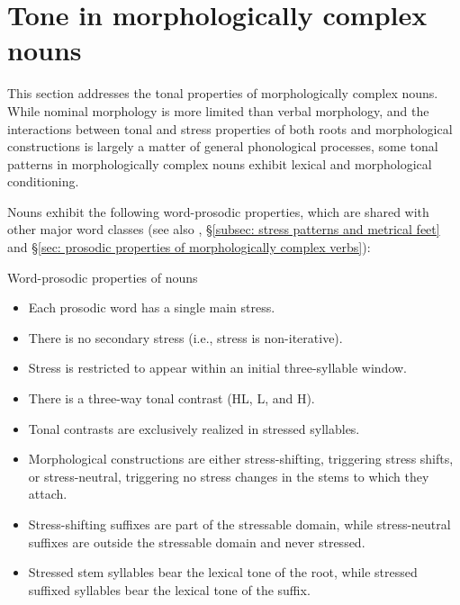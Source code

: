 


\section{Tone in morphologically complex nouns}
\label{sec: tone in morphologically complex nouns}
\largerpage[2]
This section addresses the tonal properties of morphologically complex nouns. While nominal morphology is more limited than verbal morphology, and the interactions between tonal and stress properties of both roots and morphological constructions is largely a matter of general phonological processes, some tonal patterns in morphologically complex nouns exhibit lexical and morphological conditioning.

Nouns exhibit the following word-prosodic properties, which are shared with other major word classes (see also , §\ref{subsec: stress patterns and metrical feet} and §\ref{sec: prosodic properties of morphologically complex verbs}):

\ea\label{ex: word-prosodic properties of nouns}
{Word-prosodic properties of nouns}\\

\begin{itemize}
    \item   Each prosodic word has a single main stress.\\
    \item   There is no secondary stress (i.e., stress is non-iterative).\\
    \item   Stress is restricted to appear within an initial three-syllable window.\\
    \item   There is a three-way tonal contrast (HL, L, and H).\\
    \item   Tonal contrasts are exclusively realized in stressed syllables.\\
    \item   Morphological constructions are either stress-shifting, triggering stress shifts, or stress-neutral, triggering no stress changes in the stems to which they attach.\\
    \item    Stress-shifting suffixes are part of the stressable domain, while stress-neutral suffixes are outside the stressable domain and never stressed.\\
    \item   Stressed stem syllables bear the lexical tone of the root, while stressed suffixed syllables bear the lexical tone of the suffix.\\
\end{itemize}

